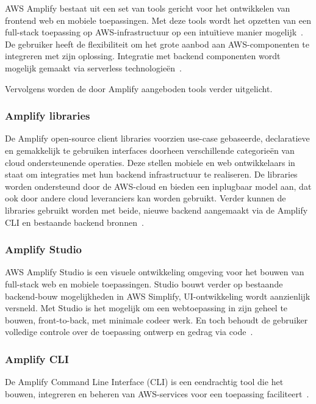 
AWS Amplify bestaat uit een set van tools gericht voor het ontwikkelen van frontend web en mobiele toepassingen.
Met deze tools wordt het opzetten van een full-stack toepassing op AWS-infrastructuur op een intuïtieve manier mogelijk~\autocite{AWSCopilotOverview}.
De gebruiker heeft de flexibiliteit om het grote aanbod aan AWS-componenten te integreren met zijn oplossing.
Integratie met backend componenten wordt mogelijk gemaakt via serverless technologieën~\autocite{Kandaswamy2022}.

Vervolgens worden de door Amplify aangeboden tools verder uitgelicht.

\subsubsection{Amplify libraries}

De Amplify open-source client libraries voorzien use-case gebaseerde, declaratieve en gemakkelijk te gebruiken interfaces
doorheen verschillende categorieën van cloud ondersteunende operaties.
Deze stellen mobiele en web ontwikkelaars in staat om integraties met hun backend infrastructuur te realiseren.
De libraries worden ondersteund door de AWS-cloud en bieden een inplugbaar model aan, dat ook door andere cloud leveranciers kan worden gebruikt.
Verder kunnen de libraries gebruikt worden met beide, nieuwe backend aangemaakt via de Amplify CLI en bestaande backend bronnen~\autocite{AWSAmplifyDocs}.

\subsubsection{Amplify Studio}

AWS Amplify Studio is een visuele ontwikkeling omgeving voor het bouwen van full-stack web en mobiele toepassingen.
Studio bouwt verder op bestaande backend-bouw mogelijkheden in AWS Simplify, UI-ontwikkeling wordt aanzienlijk versneld.
Met Studio is het mogelijk om een webtoepassing in zijn geheel te bouwen, front-to-back, met minimale codeer werk.
En toch behoudt de gebruiker volledige controle over de toepassing ontwerp en gedrag via code~\autocite{AWSAmplifyDocs}.

\subsubsection{Amplify CLI}

De Amplify Command Line Interface (CLI) is een eendrachtig tool die het bouwen, integreren en beheren van AWS-services voor een toepassing faciliteert~\autocite{AWSAmplifyDocs}.

